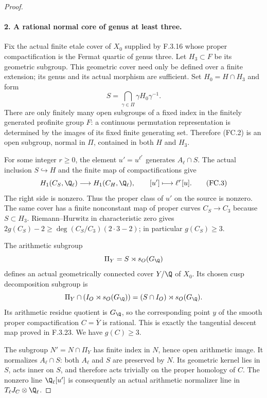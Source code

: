 \begin{proof}
\paragraph{2. A rational normal core of genus at least three.}
Fix the actual finite etale cover of $X_0$ supplied
by F.3.16 whose proper compactification is the
Fermat quartic of genus three. Let $H_3\subset F$
be its geometric subgroup. This geometric cover
need only be defined over a finite extension;
its genus and its actual morphism are sufficient.
Set $H_0=H\cap H_3$ and form
\[
                  S=\bigcap_{\gamma\in\Pi}
                          \gamma H_0\gamma^{-1}.           \tag{FC.2}
\]
There are only finitely many open subgroups of a
fixed index in the finitely generated profinite
group $F$: a continuous permutation representation
is determined by the images of its fixed finite
generating set. Therefore (FC.2) is an open
subgroup, normal in $\Pi$, contained in both
$H$ and $H_3$.

For some integer $r\geq0$, the element
$u'=u^{\ell^r}$ generates $A_\ell\cap S$.
The actual inclusion $S\hookrightarrow H$ and
the finite map of compactifications give
\[
 H_1(C_S,\Q_\ell)\longrightarrow H_1(C_H,\Q_\ell),
                    \qquad [u']\longmapsto\ell^r[u].       \tag{FC.3}
\]
The right side is nonzero. Thus the proper class
of $u'$ on the source is nonzero. The same cover
has a finite nonconstant map of proper curves
$C_S\to C_3$ because $S\subset H_3$.
Riemann--Hurwitz in characteristic zero gives
$2g(C_S)-2\geq\deg(C_S/C_3)(2\cdot3-2)$;
in particular $g(C_S)\geq3$.

The arithmetic subgroup
\[
                     \Pi_Y=S\rtimes s_O(G_\Q)
\]
defines an actual geometrically connected cover
$Y/\Q$ of $X_0$. Its chosen cusp decomposition
subgroup is
\[
 \Pi_Y\cap(I_O\rtimes s_O(G_\Q))
                  =(S\cap I_O)\rtimes s_O(G_\Q).
\]
Its arithmetic residue quotient is $G_\Q$, so
the corresponding point $y$ of the smooth proper
compactification $C=\overline Y$ is rational.
This is exactly the tangential descent map
proved in F.3.23. We have $g(C)\geq3$.

The subgroup $N'=N\cap\Pi_Y$ has finite index in
$N$, hence open arithmetic image. It normalizes
$A_\ell\cap S$: both $A_\ell$ and $S$ are preserved
by $N$. Its geometric kernel lies in $S$, acts
inner on $S$, and therefore acts trivially on
the proper homology of $C$. The nonzero line
$\Q_\ell[u']$ is consequently an actual
arithmetic normalizer line in $T_\ell J_C\otimes\Q_\ell$.


\end{proof}
